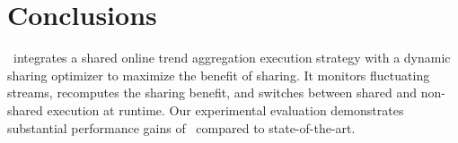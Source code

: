 \section{Conclusions}
\label{sec:conclusions}

\app\ integrates a shared online trend aggregation execution strategy with a dynamic sharing optimizer to maximize the benefit of sharing. 
It monitors fluctuating streams, recomputes the sharing benefit, and switches between shared and non-shared execution at runtime. 
Our experimental evaluation demonstrates substantial performance gains of \app\ compared to state-of-the-art.